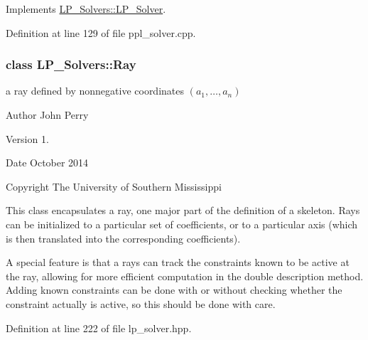 Implements \hyperlink{group___c_l_s_solvers_aea1a5bf98a2c4c06b0550cacdf8b88fd}{L\+P\+\_\+\+Solvers\+::\+L\+P\+\_\+\+Solver}.



Definition at line 129 of file ppl\+\_\+solver.\+cpp.

\label{class_l_p___solvers_1_1_ray}
\subsubsection{class L\+P\+\_\+\+Solvers\+:\+:Ray}
a ray defined by nonnegative coordinates $(a_1,\ldots,a_n)$ 

\begin{DoxyAuthor}{Author}
John Perry 
\end{DoxyAuthor}
\begin{DoxyVersion}{Version}
1. 
\end{DoxyVersion}
\begin{DoxyDate}{Date}
October 2014 
\end{DoxyDate}
\begin{DoxyCopyright}{Copyright}
The University of Southern Mississippi
\end{DoxyCopyright}
This class encapsulates a ray, one major part of the definition of a skeleton. Rays can be initialized to a particular set of coefficients, or to a particular axis (which is then translated into the corresponding coefficients).

A special feature is that a rays can track the constraints known to be active at the ray, allowing for more efficient computation in the double description method. Adding known constraints can be done with or without checking whether the constraint actually is active, so this should be done with care. 

Definition at line 222 of file lp\+\_\+solver.\+hpp.

